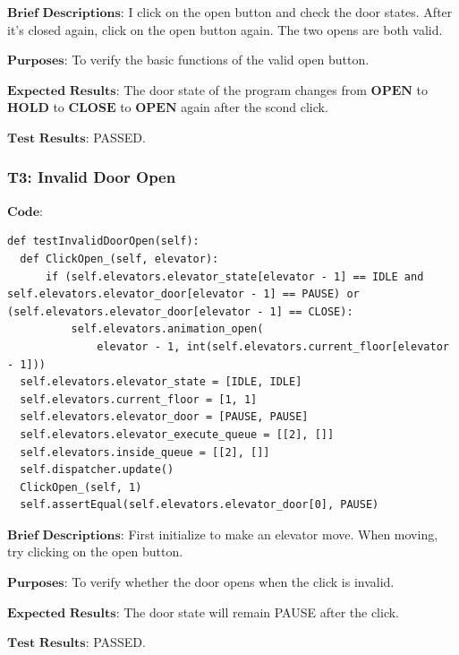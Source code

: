 \documentclass{article}
\begin{document}
$\textbf{Brief Descriptions:}$
I click on the open button and check the door states. After it's closed again, click on the open button again. The two opens are both valid.

$\textbf{Purposes:}$
To verify the basic functions of the valid open button.

$\textbf{Expected Results:}$
The door state of the program changes from $\textbf{OPEN}$ to $\textbf{HOLD}$ to $\textbf{CLOSE}$ to $\textbf{OPEN}$ again after the scond click.

$\textbf{Test Results:}$
PASSED.

\subsubsection*{T3: Invalid Door Open}
$\textbf{Code:}$
\begin{lstlisting}
def testInvalidDoorOpen(self):
  def ClickOpen_(self, elevator):
      if (self.elevators.elevator_state[elevator - 1] == IDLE and self.elevators.elevator_door[elevator - 1] == PAUSE) or (self.elevators.elevator_door[elevator - 1] == CLOSE):
          self.elevators.animation_open(
              elevator - 1, int(self.elevators.current_floor[elevator - 1]))
  self.elevators.elevator_state = [IDLE, IDLE]
  self.elevators.current_floor = [1, 1]
  self.elevators.elevator_door = [PAUSE, PAUSE]
  self.elevators.elevator_execute_queue = [[2], []]
  self.elevators.inside_queue = [[2], []]
  self.dispatcher.update()
  ClickOpen_(self, 1)
  self.assertEqual(self.elevators.elevator_door[0], PAUSE)
\end{lstlisting}

$\textbf{Brief Descriptions:}$
First initialize to make an elevator move. When moving, try clicking on the open button.

$\textbf{Purposes:}$
To verify whether the door opens when the click is invalid.

$\textbf{Expected Results:}$
The door state will remain PAUSE after the click.

$\textbf{Test Results:}$
PASSED.
\end{document}
